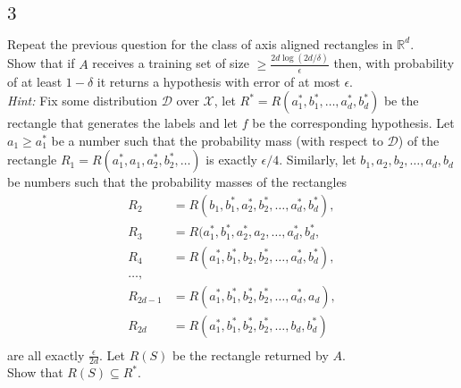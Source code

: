\documentclass[10pt, a4paper, twoside]{amsart}
\newcommand{\R}{\ensuremath{\mathbb{R}}}
\begin{document}
\subsection*{$3$}
Repeat the previous question for the class of axis aligned rectangles in $\R^d$. \\
Show that if $A$ receives a training set of size $\geq \frac{2d \log (2d/\delta)}{\epsilon}$ then, with probability of at least $1-\delta$ it returns a hypothesis with error  of at most $\epsilon$.\\
\textit{Hint:} Fix some distribution $\mathcal{D}$ over $\mathcal{X}$, let $R^* = R(a_1^*,b_1^*,\ldots,a_d^*,b_d^*)$ be the rectangle that generates the labels and let $f$ be the corresponding hypothesis. Let $a_1 \geq a_1^*$ be a number such that the probability mass (with respect to $\mathcal{D}$) of the rectangle $R_1 = R(a_1^*,a_1,a_2^*,b_2^*, \ldots)$ is exactly $\epsilon/4$. Similarly, let $b_1,a_2,b_2, \ldots,a_d,b_d$ be numbers such that the probability masses of the rectangles
\begin{align*}
  R_2 & = R(b_1,b_1^*,a_2^*,b_2^*,\ldots ,a_d^*,b_d^*), \\
  R_3 & =  R(a_1^*,b_1^*,a_2^*,a_2, \ldots , a_d^*, b_d^*,\\
  R_4 & =  R(a_1^*,b_1^*,b_2,b_2^*,\ldots , a_d^*,b_d^*), \\
  \ldots, \\
  R_{2d-1} & = R(a_1^*,b_1^*,b_2^*,b_2^*,\ldots , a_d^*,a_d),\\
  R_{2d} & = R(a_1^*,b_1^*,b_2^*,b_2^*,\ldots , b_d,b_d^*)\\
\end{align*}
  are all exactly $\frac{\epsilon}{2d}$. Let $R(S)$ be the rectangle returned by $A$.\\
Show that $R(S)\subseteq R^*$.
\end{document}
